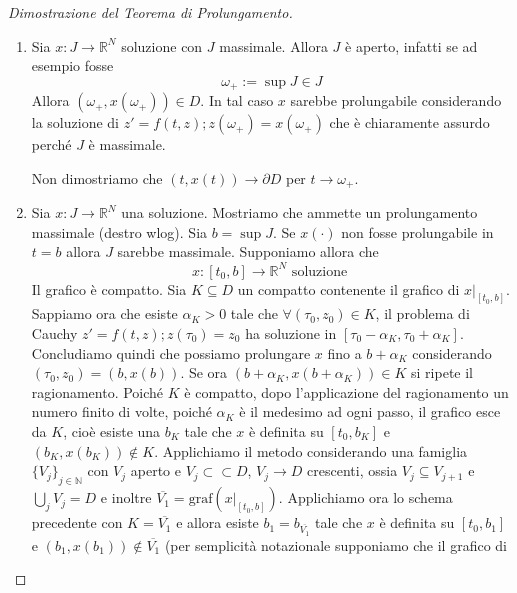 \begin{proof}[Dimostrazione del Teorema di Prolungamento] \(\) 
\begin{enumerate}[label = \alph*)]
    \item Sia \(x : J \to \mathbb{R}^{N}\) soluzione con \(J\) massimale. Allora
        \(J\) è aperto, infatti se ad esempio fosse
        \[
            \omega_+ := \sup J \in J
        \]
        Allora \((\omega_+, x(\omega_+)) \in D\). In tal caso \(x\) sarebbe
        prolungabile considerando la soluzione di \(z' = f(t, z) ; z(\omega_+) =
        x(\omega_+)\) che è chiaramente assurdo perché \(J\) è massimale.

        Non dimostriamo che \((t, x(t)) \to \partial D\) per \(t \to \omega_+\).
    \item Sia \(x : J \to \mathbb{R}^{N}\) una soluzione. Mostriamo che ammette
        un prolungamento massimale (destro wlog). Sia \(b = \sup J\). Se
        \(x(\cdot )\) non fosse prolungabile in \(t=b\) allora \(J\) sarebbe
        massimale. Supponiamo allora che
        \[
            x : [t_{0}, b] \to \mathbb{R}^{N} \text{ soluzione }
        \]
        Il grafico è compatto. Sia \(K \subseteq D \) un compatto contenente il
        grafico di \(x|_{[t_{0}, b]}\). Sappiamo ora che esiste \(\alpha_K >0\)
        tale che \(\forall (\tau_0, z_0) \in K\), il problema di Cauchy \(z' =
        f(t, z) ; z(\tau_0) = z_{0}\) ha soluzione in \([\tau_0 - \alpha_K, \tau_0
        + \alpha_K]\). Concludiamo quindi che possiamo prolungare \(x\) fino a
        \(b + \alpha_K\) considerando \((\tau_0, z_{0}) = (b, x(b))\). Se ora
        \((b + \alpha_K, x(b + \alpha_K)) \in K\) si ripete il ragionamento.
        Poiché \(K\) è compatto, dopo l'applicazione del ragionamento un numero
        finito di volte, poiché \(\alpha_K\) è il medesimo ad ogni passo, il
        grafico esce da \(K\), cioè esiste una \(b_K\) tale che \(x\) è definita
        su \([t_{0}, b_K]\) e \((b_K, x(b_K)) \not\in K\). Applichiamo il metodo
        considerando una famiglia \({\{V_{j}\}}_{j \in \mathbb{N}}\) con
        \(V_{j}\) aperto e \(V_{j} \subset\subset D \), \( V_{j} \to D \) crescenti,
        ossia \(V_{j} \subseteq V_{j+1}  \) e \(\bigcup_{j} V_{j} = D\) e
        inoltre \(\overline{V_{1}} = \text{graf}(x|_{[t_{0},b]})\). Applichiamo
        ora lo schema precedente con \(K = \overline{V_{1}}\) e allora esiste
        \(b_{1} = b_{\overline{V_{1}}} \) tale che \(x\) è definita su \([t_{0},
        b_{1}]\) e \((b_{1}, x(b_{1})) \not\in \overline{V_{1}}\) (per
        semplicità notazionale supponiamo che il grafico di

\end{enumerate}
\end{proof}
